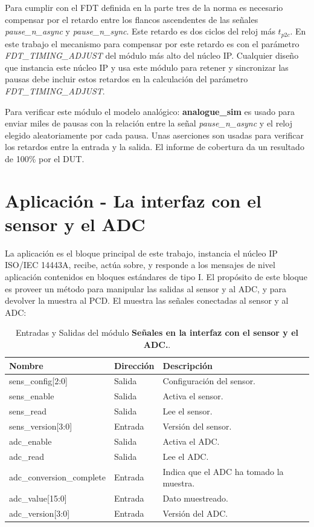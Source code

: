 \documentclass[a4paper, twoside, 11pt]{report}
\begin{document}
Para cumplir con el FDT definida en la parte tres de la norma es necesario compensar por el retardo entre los flancos ascendentes de las señales \textit{pause\_n\_async} y \textit{pause\_n\_sync}. Este retardo es dos ciclos del reloj más $t_{p2c}$. En este trabajo el mecanismo para compensar por este retardo es con el parámetro \textit{FDT\_TIMING\_ADJUST} del módulo más alto del núcleo IP. Cualquier diseño que instancia este núcleo IP y usa este módulo para retener y sincronizar las pausas debe incluir estos retardos en la calculación del parámetro \textit{FDT\_TIMING\_ADJUST}.

Para verificar este módulo el modelo analógico: \textbf{analogue\_sim} es usado para enviar miles de pausas con la relación entre la señal \textit{pause\_n\_async} y el reloj elegido aleatoriamente por cada pausa. Unas aserciones son usadas para verificar los retardos entre la entrada y la salida. El informe de cobertura da un resultado de 100\% por el DUT.

\FloatBarrier
\section{Aplicación - \LARGE{La interfaz con el sensor y el ADC}}

La aplicación es el bloque principal de este trabajo, instancia el núcleo IP ISO/IEC 14443A, recibe, actúa sobre, y responde a los mensajes de nivel aplicación contenidos en bloques estándares de tipo I. El propósito de este bloque es proveer un método para manipular las salidas al sensor y al ADC, y para devolver la muestra al PCD. El  muestra las señales conectadas al sensor y al ADC:

\begin{table}[htb]
  \centering
  \tablezebra
  \begin{tabulary}{\linewidth}{l|l|L}
    \setcounter{rownum}{0}
    \textbf{Nombre}&\textbf{Dirección}&\textbf{Descripción} \\
    \hline
    sens\_config[2:0]&Salida&Configuración del sensor. \\
    sens\_enable&Salida&Activa el sensor. \\
    sens\_read&Salida&Lee el sensor. \\
    sens\_version[3:0]&Entrada&Versión del sensor. \\
    adc\_enable&Salida&Activa el ADC. \\
    adc\_read&Salida&Lee el ADC. \\
    adc\_conversion\_complete&Entrada&Indica que el ADC ha tomado la muestra. \\
    adc\_value[15:0]&Entrada&Dato muestreado. \\
    adc\_version[3:0]&Entrada&Versión del ADC. \\
  \end{tabulary}
  \caption{Entradas y Salidas del módulo \textbf{Señales en la interfaz con el sensor y el ADC.}.}
  \label{tab:sens_adc_signals}
\end{table}
\end{document}
